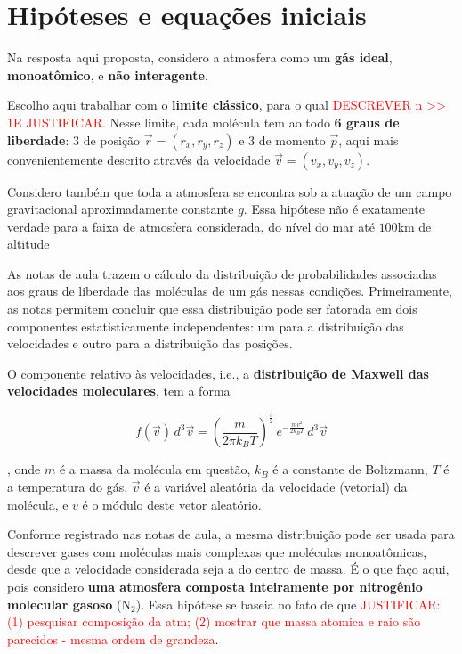 \documentclass[12pt]{extarticle} %
\begin{document}
\section{Hipóteses e equações iniciais}

Na resposta aqui proposta, considero a atmosfera como um \textbf{gás ideal}, \textbf{monoatômico}, e \textbf{não interagente}.

\par Escolho aqui trabalhar com o  \textbf{limite clássico}, para o qual \textcolor{red}{DESCREVER n >> 1E JUSTIFICAR}. Nesse limite, cada molécula tem ao todo \textbf{6 graus de liberdade}: 3 de posição $\vec{r}=(r_x, r_y, r_z)$ e 3 de momento $\vec{p}$, aqui mais convenientemente descrito através da velocidade $\vec{v}=(v_x,v_y,v_z)$.

\par Considero também que toda a atmosfera se encontra sob a atuação de um campo gravitacional aproximadamente constante $g$. Essa hipótese não é exatamente verdade para a faixa de atmosfera considerada, do nível do mar até $100$km de altitude

\par As notas de aula trazem o cálculo da distribuição de probabilidades associadas aos graus de liberdade das moléculas de um gás nessas condições. Primeiramente, as notas permitem concluir que essa distribuição pode ser fatorada em dois componentes estatisticamente independentes: um para a distribuição das velocidades e outro para a distribuição das posições.

\par O componente relativo às velocidades, i.e., a \textbf{distribuição de Maxwell das velocidades moleculares}, tem a forma

\begin{equation}
    f(\vec{v})\,d^3\vec{v} = \left(\frac{m}{2\pi k_BT}\right)^{\frac{3}{2}}\,e^{-\frac{mv^2}{2k_BT}}\,d^3\vec{v}
\label{Mw_v}
\end{equation}

\noindent, onde $m$ é a massa da molécula em questão, $k_B$ é a constante de Boltzmann, $T$ é a temperatura do gás, $\vec{v}$ é a variável aleatória da velocidade (vetorial) da molécula, e $v$ é o módulo deste vetor aleatório.

\par Conforme registrado nas notas de aula, a mesma distribuição pode ser usada para descrever gases com moléculas mais complexas que moléculas monoatômicas, desde que a velocidade considerada seja a do centro de massa. É o que faço aqui, pois considero \textbf{uma atmosfera composta inteiramente por nitrogênio molecular gasoso} (N$_2$). Essa hipótese se baseia no fato de que \textcolor{red}{JUSTIFICAR: (1) pesquisar composição da atm; (2) mostrar que massa atomica e raio são parecidos - mesma ordem de grandeza}.
\end{document}
